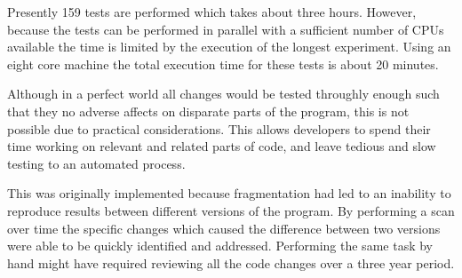 Presently 159 tests are performed which takes about three hours.
However, because the tests can be performed in parallel with a sufficient number of CPUs available the time is limited by the execution of the longest experiment.
Using an eight core machine the total execution time for these tests is about 20 minutes.

Although in a perfect world all changes would be tested throughly enough such that they no adverse affects on disparate parts of the program, this is not possible due to practical considerations.
This allows developers to spend their time working on relevant and related parts of code, and leave tedious and slow testing to an automated process.

This was originally implemented because fragmentation had led to an inability to reproduce results between different versions of the program.
By performing a scan over time the specific changes which caused the difference between two versions were able to be quickly identified and addressed.
Performing the same task by hand might have required reviewing all the code changes over a three year period.




